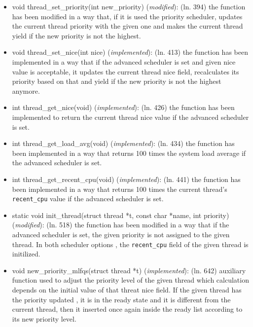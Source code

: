 \documentclass[11pt]{scrartcl}
\begin{document}
\begin{itemize}
	\item void thread\_set\_priority(int new\_priority) (\textit{modified}): \newline 
	(ln. 394) the function has been modified in a way that, if it is used the priority scheduler, updates the current thread priority with the given one and makes the current thread yield if the new priority is not the highest.
	
	\item void thread\_set\_nice(int nice) (\textit{implemented}): \newline 
	(ln. 413) the function has been implemented in a way that if the advanced scheduler is set and given nice value is acceptable, it updates the current thread nice field, recalculates its priority based on that and yield if the new priority is not the highest anymore.
	\item  int thread\_get\_nice(void) (\textit{implemented}): \newline 
	(ln. 426) the function has been implemented to return the current thread nice value if the advanced scheduler is set.
	\item int thread\_get\_load\_avg(void) (\textit{implemented}): \newline
	(ln. 434) the function has been implemented in a way that returns 100 times the system load average if the advanced scheduler is set.
	\item int thread\_get\_recent\_cpu(void) (\textit{implemented}): \newline
	(ln. 441) the function has been implemented in a way that returns 100 times the current thread's \texttt{recent\_cpu} value if the advanced scheduler is set.
	\item static void init\_thread(struct thread *t, const char *name, int priority) (\textit{modified}): \newline
	(ln. 518) the function has been modified in a way that if the advanced scheduler is set, the given priority is not assigned to the given thread. In both scheduler options , the \texttt{recent\_cpu} field of the given thread is initilized.
	\item void new\_priority\_mlfqs(struct thread *t) (\textit{implemented}): \newline
	(ln. 642) auxiliary function used to adjust the priority level of the given thread which calculation depends on the initial value of that threat nice field. 
	If the given thread has the priority updated , it is in the ready state and it is different from the current thread, then it inserted once again inside the ready list according to its new priority level.
	

\end{itemize}
\end{document}
